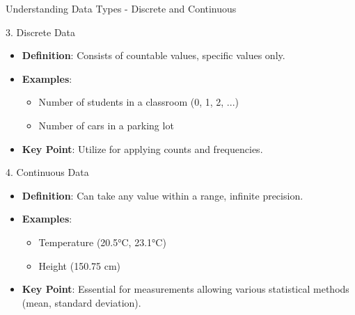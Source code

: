 \documentclass[aspectratio=169]{beamer}
\begin{document}
\begin{frame}[fragile]{Understanding Data Types - Discrete and Continuous}
    \begin{block}{3. Discrete Data}
        \begin{itemize}
            \item \textbf{Definition}: Consists of countable values, specific values only.
            \item \textbf{Examples}:
                \begin{itemize}
                    \item Number of students in a classroom (0, 1, 2, ...)
                    \item Number of cars in a parking lot
                \end{itemize}
            \item \textbf{Key Point}: Utilize for applying counts and frequencies.
        \end{itemize}
    \end{block}
    
    \begin{block}{4. Continuous Data}
        \begin{itemize}
            \item \textbf{Definition}: Can take any value within a range, infinite precision.
            \item \textbf{Examples}:
                \begin{itemize}
                    \item Temperature (20.5°C, 23.1°C)
                    \item Height (150.75 cm)
                \end{itemize}
            \item \textbf{Key Point}: Essential for measurements allowing various statistical methods (mean, standard deviation).
        \end{itemize}
    \end{block}
\end{frame}
\end{document}

